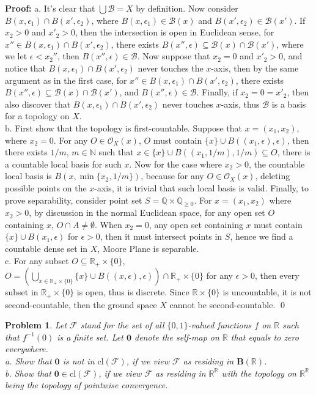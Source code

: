 \documentclass[12pt]{article}
\newtheorem{problem}{Problem}
\begin{document}
\textbf{Proof:} a. It's clear that $\bigcup\mathcal{B}=X$ by definition. Now consider $B(x,\epsilon_{1})\cap B(x',\epsilon_{2})$, where $B(x,\epsilon_{1})\in\mathcal{B}(x)$ and $B(x',\epsilon_{2})\in\mathcal{B}(x')$. If $x_{2}>0$ and $x'_{2}>0$, then the intersection is open in Euclidean sense, for $x''\in B(x,\epsilon_{1})\cap B(x',\epsilon_{2})$, there exists $B(x'',\epsilon)\subseteq\mathcal{B}(x)\cap\mathcal{B}(x')$, where we let $\epsilon<x_{2}''$, then $B(x'',\epsilon)\in\mathcal{B}$. Now suppose that $x_{2}=0$ and $x'_{2}>0$, and notice that $B(x,\epsilon_{1})\cap B(x',\epsilon_{2})$ never touches the $x$-axis, then by the same argument as in the first case, for $x''\in B(x,\epsilon_{1})\cap B(x',\epsilon_{2})$, there exists $B(x'',\epsilon)\subseteq\mathcal{B}(x)\cap\mathcal{B}(x')$, and $B(x'',\epsilon)\in\mathcal{B}$. Finally, if $x_{2}=0=x'_{2}$, then also discover that $B(x,\epsilon_{1})\cap B(x',\epsilon_{2})$ never touches $x$-axis, thus $\mathcal{B}$ is a basis for a topology on $X$. \\
\indent b. First show that the topology is first-countable. Suppose that $x=(x_{1},x_{2})$, where $x_{2}=0$. For any $O\in\mathcal{O}_{X}(x)$, $O$ must contain $\{x\}\cup B((x_{1},\epsilon),\epsilon)$, then there exists $1/m$, $m\in\mathbb{N}$ such that $x\in\{x\}\cup B((x_{1}, 1/m),1/m)\subseteq O$, there is a countable local basis for such $x$. Now for the case where $x_{2}>0$, the countable local basis is $B(x,\min\{x_{2},1/m\})$, because for any $O\in\mathcal{O}_{X}(x)$, deleting possible points on the $x$-axis, it is trivial that such local basis is valid. Finally, to prove separability, consider point set $S=\mathbb{Q}\times\mathbb{Q}_{\geq 0}$. For $x=(x_{1}, x_{2})$ where $x_{2}>0$, by discussion in the normal Euclidean space, for any open set $O$ containing $x$, $O\cap A\neq\emptyset$. When $x_{2}=0$, any open set containing $x$ must contain $\{x\}\cup B(x_{1}, \epsilon)$ for $\epsilon>0$, then it must intersect points in $S$, hence we find a countable dense set in $X$, Moore Plane is separable. \\
\indent c. For any subset $O\subseteq \mathbb{R}_{+}\times\{0\}$, $O=\left (\bigcup_{x\in\mathbb{R}_{+}\times\{0\}}\{x\}\cup B((x,\epsilon),\epsilon)\right )\cap \mathbb{R}_{+}\times \{0\}$ for any $\epsilon>0$, then every subset in $\mathbb{R}_{+}\times \{0\}$ is open, thus is discrete. Since $\mathbb{R}\times\{0\}$ is uncountable, it is not second-countable, then the ground space $X$ cannot be second-countable. \qed
\\
\begin{problem}
Let $\mathcal{F}$ stand for the set of all $\{0,1\}$-valued functions $f$ on $\mathbb{R}$ such that $f^{-1}(0)$ is a finite set. Let $\textbf{0}$ denote the self-map on $\mathbb{R}$ that equals to zero everywhere. \\
\indent a. Show that $\textbf{0}$ is not in $\text{cl}(\mathcal{F})$, if we view $\mathcal{F}$ as residing in $\textbf{B}(\mathbb{R})$. \\
\indent b. Show that $\textbf{0}\in\text{cl}(\mathcal{F})$, if we view $\mathcal{F}$ as residing in $\mathbb{R}^{\mathbb{R}}$ with the topology on $\mathbb{R}^{\mathbb{R}}$ being the topology of pointwise convergence.
\end{problem}
\end{document}
